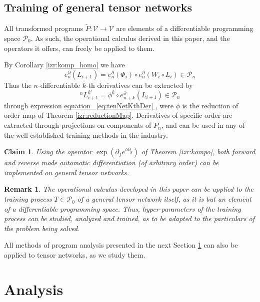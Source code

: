 \documentclass{article}
\makeatletter
\newcommand{\VV}{\mathcal{V}}
\newcommand{\dP}{\mathcal{P}}
\newcommand{\D}{\partial}
\newtheorem{trditev}{Claim}[section]
\newtheorem{opomba}{Remark}[section]
\let\originaleqref\eqref %
\renewcommand{\eqref}[1]{%
  \begingroup%
  \let\ref\@refstar%
  \hyperref[#1]{%
    equation%
    ~\originaleqref{#1}%
  }%
  \endgroup
}
\makeatother
\begin{document}
\subsection{Training of general tensor networks}\label{sec:trainNet}

All transformed programs $\tilde{P}:\VV\to\VV$ are elements of a differentiable programming space $\dP_0$. As such, the operational calculus derived in this paper, and the operators it offers, can freely be applied to them.

By Corollary \ref{izr:komp_homo} we have
\begin{equation}\label{eq:tenNetKthDer}
e^\D_n(L_{i+1})=e^\D_n(\Phi_i)\circ e^\D_n(W_i\circ L_i)\in\dP_n
\end{equation}
Thus the $n$-differentiable $k$-th derivatives can be extracted by
\begin{equation}
^{n}L_{i+1}^{k\prime}=\phi^k\circ e^\D_{n+k}(L_{i+1})\in\dP_n
\end{equation}
through expression \eqref{eq:tenNetKthDer}, were $\phi$ is the reduction of order map of Theorem \ref{izr:reductionMap}. Derivatives of specific order are extracted through projections on components of $P_n$, and can be used in any of the well established training methods in the industry. 

\begin{trditev}
Using the operator $\exp(\D_fe^{h\D_g})$ of Theorem \ref{izr:kompo}, both forward and reverse mode automatic differentiation (of arbitrary order) can be implemented on general tensor networks.
\end{trditev}

\begin{opomba}
The operational calculus developed in this paper can be applied to the training process $T\in\dP_0$ of a general tensor network itself, as it is but an element of a differentiable programming space. Thus, hyper-parameters of the training process \cite{HyperParams} can be studied, analyzed and trained, as to be adapted to the particulars of the problem being solved.
\end{opomba}

All methods of program analysis presented in the next Section \ref{sec:Analysis} can also be applied to tensor networks, as we study them.
  
\section{Analysis}\label{sec:Analysis}
  
\end{document}
